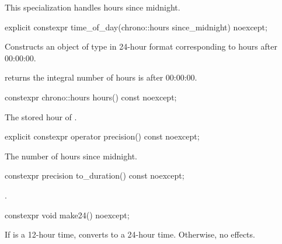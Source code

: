 \pnum
\begin{note}
This specialization handles hours since midnight.
\end{note}

%
\begin{itemdecl}
explicit constexpr time_of_day(chrono::hours since_midnight) noexcept;
\end{itemdecl}

\begin{itemdescr}
\pnum
\effects
Constructs an object of type  in 24-hour format
corresponding to  hours after 00:00:00.

\pnum
\postconditions
{} returns the integral number of hours  is after 00:00:00.
\end{itemdescr}

%
\begin{itemdecl}
constexpr chrono::hours hours() const noexcept;
\end{itemdecl}

\begin{itemdescr}
\pnum
\returns The stored hour of .
\end{itemdescr}

%
\begin{itemdecl}
explicit constexpr operator precision() const noexcept;
\end{itemdecl}

\begin{itemdescr}
\pnum
\returns The number of hours since midnight.
\end{itemdescr}

%
\begin{itemdecl}
constexpr precision to_duration() const noexcept;
\end{itemdecl}

\begin{itemdescr}
\pnum
\returns {}.
\end{itemdescr}

%
\begin{itemdecl}
constexpr void make24() noexcept;
\end{itemdecl}

\begin{itemdescr}
\pnum
\effects
If  is a 12-hour time,
converts to a 24-hour time.
Otherwise, no effects.
\end{itemdescr}

